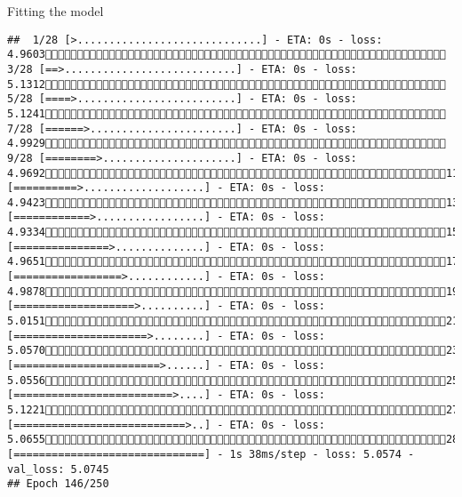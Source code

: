 \documentclass[
  ignorenonframetext,
]{beamer}
\begin{document}
\begin{frame}[fragile]{Fitting the model}
\begin{verbatim}
##  1/28 [>.............................] - ETA: 0s - loss: 4.9603 3/28 [==>...........................] - ETA: 0s - loss: 5.1312 5/28 [====>.........................] - ETA: 0s - loss: 5.1241 7/28 [======>.......................] - ETA: 0s - loss: 4.9929 9/28 [========>.....................] - ETA: 0s - loss: 4.969211/28 [==========>...................] - ETA: 0s - loss: 4.942313/28 [============>.................] - ETA: 0s - loss: 4.933415/28 [===============>..............] - ETA: 0s - loss: 4.965117/28 [=================>............] - ETA: 0s - loss: 4.987819/28 [===================>..........] - ETA: 0s - loss: 5.015121/28 [=====================>........] - ETA: 0s - loss: 5.057023/28 [=======================>......] - ETA: 0s - loss: 5.055625/28 [=========================>....] - ETA: 0s - loss: 5.122127/28 [===========================>..] - ETA: 0s - loss: 5.065528/28 [==============================] - 1s 38ms/step - loss: 5.0574 - val_loss: 5.0745
## Epoch 146/250

\end{verbatim}
\end{frame}
\end{document}
